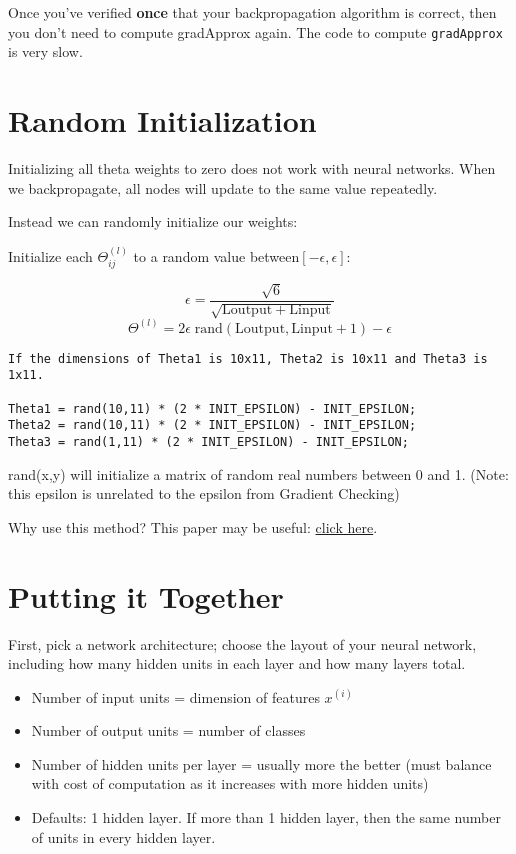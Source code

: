 Once you've verified \textbf{once} that your backpropagation algorithm is correct, then you don't need to compute gradApprox again. The code to compute \verb|gradApprox| is very slow.

\section{Random Initialization}
Initializing all theta weights to zero does not work with neural networks. When we backpropagate, all nodes will update to the same value repeatedly.

Instead we can randomly initialize our weights:

Initialize each $\Theta^{(l)}_{ij}$ to a random value between$[-\epsilon,\epsilon]$:

\[\epsilon = \dfrac{\sqrt{6}}{\sqrt{\mathrm{Loutput} + \mathrm{Linput}}}\]
\[
\Theta^{(l)} = 2 \epsilon \; \mathrm{rand}(\mathrm{Loutput}, \mathrm{Linput} + 1) - \epsilon\]
\begin{verbatim}
If the dimensions of Theta1 is 10x11, Theta2 is 10x11 and Theta3 is 1x11.

Theta1 = rand(10,11) * (2 * INIT_EPSILON) - INIT_EPSILON;
Theta2 = rand(10,11) * (2 * INIT_EPSILON) - INIT_EPSILON;
Theta3 = rand(1,11) * (2 * INIT_EPSILON) - INIT_EPSILON;
\end{verbatim}
rand(x,y) will initialize a matrix of random real numbers between 0 and 1. (Note: this epsilon is unrelated to the epsilon from Gradient Checking)

Why use this method? This paper may be useful: \href{https://web.stanford.edu/class/ee373b/nninitialization.pdf}{click here}.
\section{Putting it Together}
First, pick a network architecture; choose the layout of your neural network, including how many hidden units in each layer and how many layers total.
\begin{itemize}
	\item Number of input units = dimension of features $x^{(i)}$
	\item Number of output units = number of classes
	\item Number of hidden units per layer = usually more the better (must balance with cost of computation as it increases with more hidden units)
	\item Defaults: 1 hidden layer. If more than 1 hidden layer, then the same number of units in every hidden layer.
\end{itemize}

